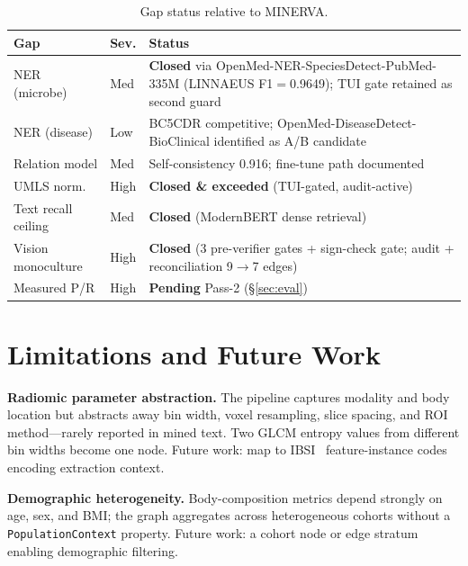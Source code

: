 \documentclass[10pt,twocolumn,letterpaper]{article}
\begin{document}
\begin{table}[t]
\centering
\small
\caption{Gap status relative to MINERVA.}
\label{tab:gap}
\begin{tabular}{@{}p{}p{}p{}@{}}
\toprule
\textbf{Gap} & \textbf{Sev.} & \textbf{Status} \\
\midrule
NER (microbe) & Med & \textbf{Closed} via OpenMed-NER-SpeciesDetect-PubMed-335M (LINNAEUS F1$=$0.9649); TUI gate retained as second guard \\
NER (disease) & Low & BC5CDR competitive; OpenMed-DiseaseDetect-BioClinical identified as A/B candidate \\
Relation model & Med & Self-consistency 0.916; fine-tune path documented \\
UMLS norm. & High & \textbf{Closed \& exceeded} (TUI-gated, audit-active) \\
Text recall ceiling & Med & \textbf{Closed} (ModernBERT dense retrieval) \\
Vision monoculture & High & \textbf{Closed} (3 pre-verifier gates + sign-check gate; audit + reconciliation 9$\rightarrow$7 edges) \\
Measured P/R & High & \textbf{Pending} Pass-2 (\S\ref{sec:eval}) \\
\bottomrule
\end{tabular}
\end{table}

\section{Limitations and Future Work}

\noindent\textbf{Radiomic parameter abstraction.} The pipeline captures
modality and body location but abstracts away bin width, voxel resampling,
slice spacing, and ROI method---rarely reported in mined text. Two GLCM
entropy values from different bin widths become one node. Future work: map
to IBSI~\cite{zwanenburg2020ibsi} feature-instance codes encoding
extraction context.

\noindent\textbf{Demographic heterogeneity.} Body-composition metrics depend
strongly on age, sex, and BMI; the graph aggregates across heterogeneous
cohorts without a \texttt{PopulationContext} property. Future work: a cohort
node or edge stratum enabling demographic filtering.
\end{document}
